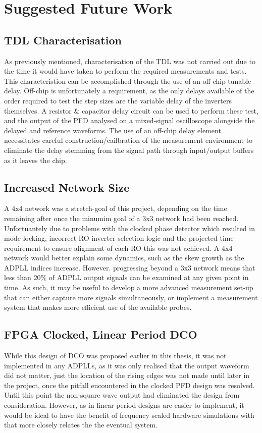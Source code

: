 \section{Suggested Future Work}
\subsection{\acl{TDL} Characterisation}
As previously mentioned, characterisation of the \ac{TDL} was not carried out due to the time it would have taken to perform the required measurements and tests. This characteristion can be accomplished through the use of an off-chip tunable delay. Off-chip is unfortunately a requirement, as the only delays available of the order required to test the step sizes are the variable delay of the inverters themselves. A resistor \& capacitor delay circuit can be used to perform these test, and the output of the \ac{PFD} analysed on a mixed-signal oscilloscope alongside the delayed and reference waveforms. The use of an off-chip delay element necessitates careful construction/cailbration of the measurement environment to eliminate the delay stemming from the signal path through input/output buffers as it leaves the chip.

\subsection{Increased Network Size}
A 4x4 network was a stretch-goal of this project, depending on the time remaining after once the minumim goal of a 3x3 network had been reached. Unfortuantely due to problems with the clocked phase detector which resulted in mode-locking, incorrect \ac{RO} inverter selection logic and the projected time requirement to ensure alignment of each \ac{RO} this was not achieved. A 4x4 network would better explain some dynamics, such as the skew growth as the \ac{ADPLL} indices increase. However. progressing beyond a 3x3 network means that less than $20\%$ of \ac{ADPLL} output signals can be examined at any given point in time. As such, it may be useful to develop a more advanced measurement set-up that can either capture more signals simultaneously, or implement a measurement system that makes more efficient use of the available probes.

\subsection{\acs{FPGA} Clocked, Linear Period \acs{DCO}}
While this design of \ac{DCO} was proposed earlier in this thesis, it was not implemented in any \ac{ADPLL}s, as it was only realised that the output waveform did not matter, just the location of the rising edges was not made until later in the project, once the pitfall encountered in the clocked \ac{PFD} design was resolved. Until this point the non-square wave output had eliminated the design from consideration. However, as in  linear period designs are easier to implement, it would be ideal to have the benefit of frequency scaled hardware simulations with  that more closely relates the the eventual system.

